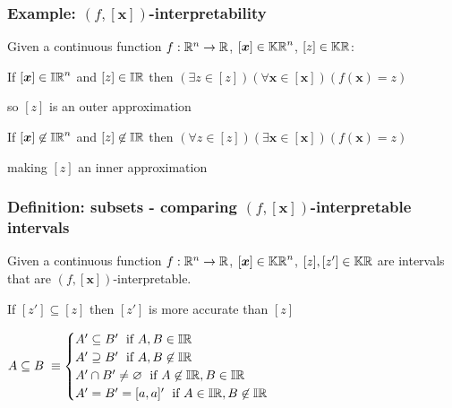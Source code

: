 \documentclass{beamer}
\begin{document}
\begin{frame}
    \frametitle{Example: $(f,[\bm{x}])$-interpretability}
 
    Given a continuous function $f: \mathbb R^n \rightarrow \mathbb R$, $[\bm{x}] \in \mathbb{KR}^n$, $[z] \in \mathbb{KR}$:

    \vspace{7mm}
    If $[\bm{x}] \in \mathbb{IR}^n$ and $[z] \in \mathbb{IR}$ then 
    $(\exists z \in [z]) (\forall \bm{x} \in [\bm{x}]) (f(\bm{x}) = z)$ \par
    so $[z]$ is an outer approximation


    \vspace{7mm}
    If $[\bm{x}] \not\in \mathbb{IR}^n$ and $[z] \not\in \mathbb{IR}$ then 
    $(\forall z \in [z]) (\exists \bm{x} \in [\bm{x}]) (f(\bm{x}) = z)$ \par
    making $[z]$ an inner approximation

\end{frame}


\begin{frame}
    \frametitle{Definition: subsets - comparing $(f,[\bm{x}])$-interpretable intervals}
 
    Given a continuous function $f: \mathbb R^n \rightarrow \mathbb R$, $[\bm{x}] \in \mathbb{KR}^n$, $[z], [z'] \in \mathbb{KR}$ are intervals that are $(f,[\bm{x}])$-interpretable.

    \vspace{2mm}
    If $[z'] \subseteq [z]$ then $[z']$ is more accurate than $[z]$

    \vspace{7mm}
    $A \subseteq B \; \equiv \begin{cases}
        A' \subseteq B' \; \text{ if } A, B \in \mathbb{IR} \\
        A' \supseteq B' \; \text{ if } A, B \not\in \mathbb{IR} \\
        A' \cap B' \neq \varnothing \; \text{ if } A \not\in\mathbb{IR}, B \in\mathbb{IR} \\
        A' = B' = [a, a]' \; \text{ if } A \in\mathbb{IR}, B \not\in\mathbb{IR} \\
    \end{cases}$

\end{frame}

\end{document}
